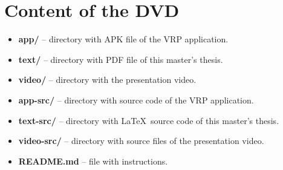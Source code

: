 \chapter{Content of the DVD}

\begin{itemize}
    \item \textbf{app/} -- directory with APK file of the VRP application.
    \item \textbf{text/} -- directory with PDF file of this master's thesis.
    \item \textbf{video/} -- directory with the presentation video.
    \item \textbf{app-src/} -- directory with source code of the VRP application.
    \item \textbf{text-src/} -- directory with \LaTeX~source code of this master's thesis.
    \item \textbf{video-src/} -- directory with source files of the presentation video.
    \item \textbf{README.md} -- file with instructions.
\end{itemize}
